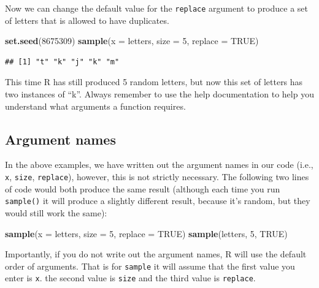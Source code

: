 \documentclass[
  oneside]{book}
\newenvironment{Shaded}{\begin{snugshade}}{\end{snugshade}}
\newcommand{\AttributeTok}[1]{\textcolor[rgb]{0.13,0.29,0.53}{#1}}
\newcommand{\ConstantTok}[1]{\textcolor[rgb]{0.56,0.35,0.01}{#1}}
\newcommand{\DecValTok}[1]{\textcolor[rgb]{0.00,0.00,0.81}{#1}}
\newcommand{\FunctionTok}[1]{\textcolor[rgb]{0.13,0.29,0.53}{\textbf{#1}}}
\newcommand{\NormalTok}[1]{#1}
\begin{document}
Now we can change the default value for the \texttt{replace} argument to produce a set of letters that is allowed to have duplicates.

\begin{Shaded}
\begin{Highlighting}[]
\FunctionTok{set.seed}\NormalTok{(}\DecValTok{8675309}\NormalTok{)}
\FunctionTok{sample}\NormalTok{(}\AttributeTok{x =}\NormalTok{ letters, }\AttributeTok{size =} \DecValTok{5}\NormalTok{, }\AttributeTok{replace =} \ConstantTok{TRUE}\NormalTok{)}
\end{Highlighting}
\end{Shaded}

\begin{verbatim}
## [1] "t" "k" "j" "k" "m"
\end{verbatim}

This time R has still produced 5 random letters, but now this set of letters has two instances of ``k''. Always remember to use the help documentation to help you understand what arguments a function requires.

\subsection{Argument names}\label{argument-names}

In the above examples, we have written out the argument names in our code (i.e., \texttt{x}, \texttt{size}, \texttt{replace}), however, this is not strictly necessary. The following two lines of code would both produce the same result (although each time you run \texttt{sample()} it will produce a slightly different result, because it's random, but they would still work the same):

\begin{Shaded}
\begin{Highlighting}[]
\FunctionTok{sample}\NormalTok{(}\AttributeTok{x =}\NormalTok{ letters, }\AttributeTok{size =} \DecValTok{5}\NormalTok{, }\AttributeTok{replace =} \ConstantTok{TRUE}\NormalTok{)}
\FunctionTok{sample}\NormalTok{(letters, }\DecValTok{5}\NormalTok{, }\ConstantTok{TRUE}\NormalTok{)}
\end{Highlighting}
\end{Shaded}

Importantly, if you do not write out the argument names, R will use the default order of arguments. That is for \texttt{sample} it will assume that the first value you enter is \texttt{x}. the second value is \texttt{size} and the third value is \texttt{replace}.
\end{document}
